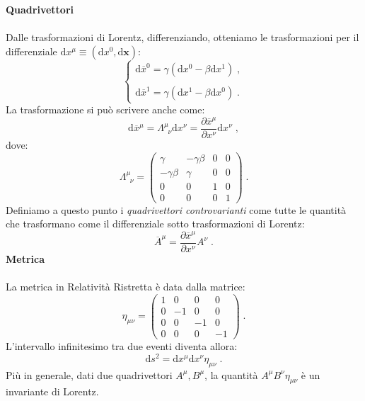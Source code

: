 \documentclass[12pt,a4paper]{report}
\theoremstyle{definition}
\newcommand{\diff}[1][]{\mathrm{d}#1}
\begin{document}
\textbf{Quadrivettori} \\
\\
Dalle trasformazioni di Lorentz, differenziando, otteniamo le trasformazioni per il differenziale $\diff{x^{\mu}}\equiv(\diff{x^0},\diff{\mathbf{x}})$:
\begin{equation}
\begin{cases}
\diff{\overline{x}^0}=\gamma(\diff{x^0}-\beta\diff{x^1})\;, \\
\\
\diff{\overline{x}^1}=\gamma(\diff{x^1}-\beta\diff{x^0})\;.
\end{cases}
\end{equation}
La trasformazione si può scrivere anche come:
\begin{equation}
\diff{\overline{x}^{\mu}}=\Lambda^{\mu}_{\;\;\nu}\diff{x^{\nu}}=\frac{\partial\overline{x}^{\mu}}{\partial x^{\nu}} \diff{x^{\nu}}\;,
\end{equation}
dove:
\begin{equation}
\Lambda^{\mu}_{\;\;\nu}=\left(\begin{matrix}
\gamma & -\gamma\beta & 0 & 0 \\
-\gamma\beta & \gamma & 0 & 0 \\
0 & 0 & 1 & 0 \\
0 & 0 & 0 & 1
\end{matrix}\right)\;.
\end{equation}
Definiamo a questo punto i \emph{quadrivettori controvarianti} come tutte le quantità che trasformano come il differenziale sotto trasformazioni di Lorentz:
$$
\overline{A}^{\mu}=\frac{\partial \overline{x}^{\mu}}{\partial x^{\nu}}A^{\nu}\;.
$$
\textbf{Metrica} \\
\\
La metrica in Relatività Ristretta è data dalla matrice:
\begin{equation}
\eta_{\mu \nu}=\left(\begin{matrix}
1 & 0 & 0 & 0 \\
0 & -1 & 0 & 0 \\
0 & 0 & -1 & 0 \\
0 & 0 & 0 & -1
\end{matrix}\right)\;.
\end{equation}
L'intervallo infinitesimo tra due eventi diventa allora:
\begin{equation*}
\diff{s^2}=\diff{x^{\mu}}\diff{x^{\nu}}\eta_{\mu \nu}\;.
\end{equation*}
Più in generale, dati due quadrivettori $A^{\mu},B^{\mu}$, la quantità $A^{\mu}B^{\nu}\eta_{\mu\nu}$ è un invariante di Lorentz. \\
\end{document}
